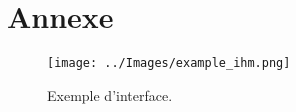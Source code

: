 \documentclass{scrartcl}
\begin{document}
\newpage
\section*{Annexe}

	\begin{figure}[!h]
		\texttt{[image: ../Images/example\_ihm.png]}
		\caption{Exemple d'interface.}
	\end{figure}
\end{document}
